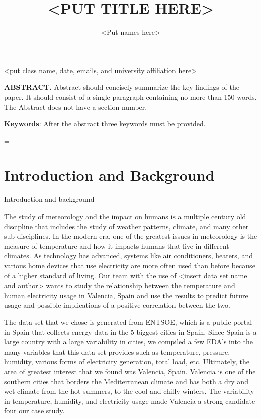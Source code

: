 \documentclass[10pt]{article}
\title{\renewcommand{\baselinestretch}{1.17}\normalsize\bf%
\uppercase{<Put Title Here>}
}
\author{
<Put names here>
}
\begin{document}
\date{}

\maketitle

\vspace{-0.5cm}

\begin{center}
{\footnotesize 
<put class name, date, emails, and university affiliation here>
}
\end{center}
\bigskip
\noindent
{\small{\bf ABSTRACT.}
Abstract should concisely
summarize the key findings of the paper. It should consist 
of a single paragraph containing no more than 150 words. 
The Abstract does not have a section number.
}

\medskip
\noindent
{\small{\bf Keywords}{:} 
After the abstract three keywords must be provided.
}

\baselineskip=\normalbaselineskip

\section{Introduction and Background}\label{sec:1}
Introduction and background

The study of meteorology and the impact on humans is a multiple century old discipline that includes the study of weather patterns, climate, and many other sub-disciplines. In the modern era, one of the greatest issues in meteorology is the measure of temperature and how it impacts humans that live in different climates. As technology has advanced, systems like air conditioners, heaters, and various home devices that use electricity are more often used than before because of a higher standard of living. Our team with the use of <insert data set name and author> wants to study the relationship between the temperature and human electricity usage in Valencia, Spain and use the results to predict future usage and possible implications of a positive correlation between the two. 

The data set that we chose is generated from ENTSOE, which is a public portal in Spain that collects energy data in the 5 biggest cities in Spain. Since Spain is a large country with a large variability in cities, we compiled a few EDA’s into the many variables that this data set provides such as temperature, pressure, humidity, various forms of electricity generation, total load, etc. Ultimately, the area of greatest interest that we found was Valencia, Spain. Valencia is one of the southern cities that borders the Mediterranean climate and has both a dry and wet climate from the hot summers, to the cool and chilly winters. The variability in temperature, humidity, and electricity usage made Valencia a strong candidate four our case study. 
\end{document}
